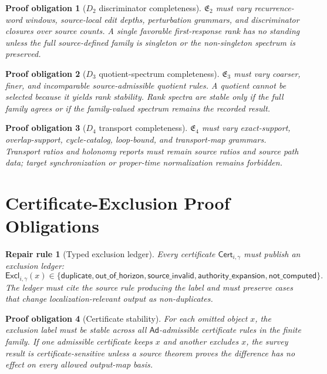 \documentclass[11pt]{article}
\newcommand{\EnumFam}{\mathfrak{E}}
\newcommand{\Cert}{\mathsf{Cert}}
\newcommand{\Ad}{\mathsf{Ad}}
\newtheorem{repairrule}{Repair rule}
\newtheorem{obligation}{Proof obligation}
\begin{document}
\begin{obligation}[\(D_2\) discriminator completeness]
\(\EnumFam_2\) must vary recurrence-word windows, source-local edit depths,
perturbation grammars, and discriminator closures over source counts. A
single favorable first-response rank has no standing unless the full
source-defined family is singleton or the non-singleton spectrum is preserved.
\end{obligation}

\begin{obligation}[\(D_3\) quotient-spectrum completeness]
\(\EnumFam_3\) must vary coarser, finer, and incomparable source-admissible
quotient rules. A quotient cannot be selected because it yields rank
stability. Rank spectra are stable only if the full family agrees or if the
family-valued spectrum remains the recorded result.
\end{obligation}

\begin{obligation}[\(D_4\) transport completeness]
\(\EnumFam_4\) must vary exact-support, overlap-support, cycle-catalog,
loop-bound, and transport-map grammars. Transport ratios and holonomy reports
must remain source ratios and source path data; target synchronization or
proper-time normalization remains forbidden.
\end{obligation}

\section{Certificate-Exclusion Proof Obligations}

\begin{repairrule}[Typed exclusion ledger]
Every certificate \(\Cert_{i,\gamma}\) must publish an exclusion ledger:
\[
\mathsf{Excl}_{i,\gamma}(x)\in
\{\mathsf{duplicate},\mathsf{out\_of\_horizon},
\mathsf{source\_invalid},\mathsf{authority\_expansion},
\mathsf{not\_computed}\}.
\]
The ledger must cite the source rule producing the label and must preserve
cases that change localization-relevant output as non-duplicates.
\end{repairrule}

\begin{obligation}[Certificate stability]
For each omitted object \(x\), the exclusion label must be stable across all
\(\Ad\)-admissible certificate rules in the finite family. If one admissible
certificate keeps \(x\) and another excludes \(x\), the survey result is
certificate-sensitive unless a source theorem proves the difference has no
effect on every allowed output-map basis.
\end{obligation}
\end{document}
